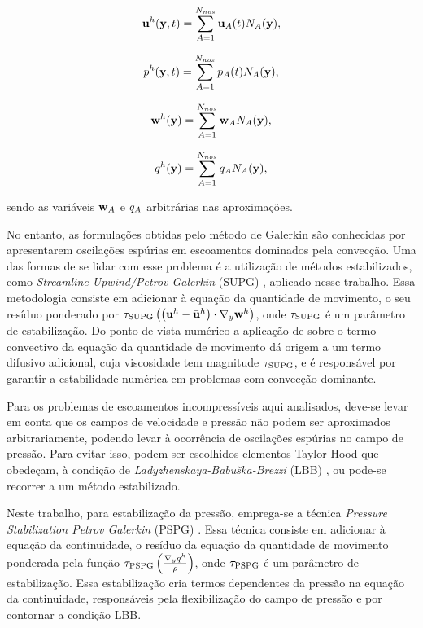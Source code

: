 \documentclass[tese_patricia]{subfiles}%
\begin{document}
\begin{align}
\mathbf{u}^{h}(\mathbf{y},t) = \sum_{A = 1}^{N_{nos}} \mathbf{u}_{A}(t)N_{A}(\mathbf{y}), \label{eq:dis_vel}
\end{align}

\begin{align}
p^{h}(\mathbf{y},t)  = \sum_{A = 1}^{N_{nos}} p_{A}(t)N_{A}(\mathbf{y}),
\end{align}

\begin{align}
\mathbf{w}^{h}(\mathbf{y})  = \sum_{A = 1}^{N_{nos}} \mathbf{w}_{A}N_{A}(\mathbf{y}), \label{eq:utest}
\end{align}

\begin{align}
q^{h}(\mathbf{y})  = \sum_{A = 1}^{N_{nos}} q_{A}N_{A}(\mathbf{y}), \label{eq:ptest} 
\end{align}

\noindent sendo as variáveis $\mathbf{w}_{A}$ e $q_{A}$ arbitrárias nas aproximações.

No entanto, as formulações obtidas pelo método de Galerkin são conhecidas por apresentarem oscilações espúrias em escoamentos dominados pela convecção. Uma das formas de se lidar com esse problema é a utilização de métodos estabilizados, como \textit{Streamline-Upwind/Petrov-Galerkin} (SUPG) \cite{BrooksH:1982, HughesT:1984}, aplicado nesse trabalho. Essa metodologia consiste em adicionar à equação da quantidade de movimento, o seu resíduo ponderado por $\tau_{\mathrm{SUPG}} \left(\left(\mathbf{u}^h - \bar{\mathbf{u}}^h \right) \cdot \nabla_y\mathbf{w}^h\right)$, onde $\tau_{\mathrm{SUPG}}$ é um parâmetro de estabilização. Do ponto de vista numérico a aplicação de  sobre o termo convectivo da equação da quantidade de movimento dá origem a um termo difusivo adicional, cuja viscosidade tem magnitude $\tau_{\mathrm{SUPG}}$, e é responsável por garantir a estabilidade numérica em problemas com convecção dominante.

Para os problemas de escoamentos incompressíveis aqui analisados, deve-se levar em conta que os campos de velocidade e pressão não podem ser aproximados arbitrariamente, podendo levar à ocorrência de oscilações espúrias no campo de pressão. Para evitar isso, podem ser escolhidos elementos Taylor-Hood que obedeçam, à condição de \textit{Ladyzhenskaya-Babuška-Brezzi} (LBB) \cite{BrezziF:1991,ZienkiewiczTN:2005,StrangF:2008}, ou pode-se recorrer a um método estabilizado. 

Neste trabalho, para estabilização da pressão, emprega-se a técnica \textit{Pressure Stabilization Petrov Galerkin} (PSPG)   \cite{HughesFB:1986,TezduyarMRS:1992a}. Essa técnica consiste em adicionar à equação da continuidade, o resíduo da equação da quantidade de movimento ponderada pela função $\tau_{\mathrm{PSPG}} \left(\frac{\nabla_y q^h}{\rho}\right)$, onde $\tau_{\mathrm{PSPG}}$ é um parâmetro de estabilização. Essa estabilização cria termos dependentes da pressão na equação da continuidade, responsáveis pela flexibilização do campo de pressão e por contornar a condição LBB.
\end{document}
